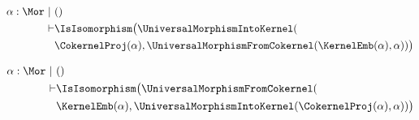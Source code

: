 \begin{sequent}
\begin{align*}
  \alpha:\Mor~|~ &() \\
  \vdash &\IsIsomorphism\big( \UniversalMorphismIntoKernel( \\
  &\CokernelProj( \alpha ), \UniversalMorphismFromCokernel( \KernelEmb( \alpha ), \alpha ))\big)
\end{align*}
\end{sequent}

\begin{sequent}
\begin{align*}
  \alpha:\Mor~|~ &() \\
  \vdash &\IsIsomorphism\big( \UniversalMorphismFromCokernel( \\
  &\KernelEmb( \alpha ), \UniversalMorphismIntoKernel( \CokernelProj( \alpha ), \alpha ))\big)
\end{align*}
\end{sequent}